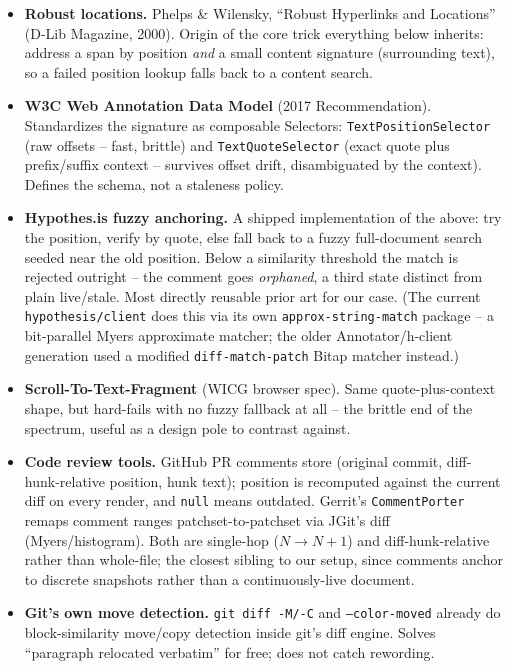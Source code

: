 \documentclass{amsart}
\theoremstyle{remark}
\begin{document}
    \begin{itemize}
        \item \textbf{Robust locations.} Phelps \& Wilensky, ``Robust Hyperlinks and Locations'' (D-Lib Magazine, 2000). Origin of the core trick everything below inherits: address a span by position \emph{and} a small content signature (surrounding text), so a failed position lookup falls back to a content search.
        \item \textbf{W3C Web Annotation Data Model} (2017 Recommendation). Standardizes the signature as composable Selectors: \texttt{TextPositionSelector} (raw offsets -- fast, brittle) and \texttt{TextQuoteSelector} (exact quote plus prefix/suffix context -- survives offset drift, disambiguated by the context). Defines the schema, not a staleness policy.
        \item \textbf{Hypothes.is fuzzy anchoring.} A shipped implementation of the above: try the position, verify by quote, else fall back to a fuzzy full-document search seeded near the old position. Below a similarity threshold the match is rejected outright -- the comment goes \emph{orphaned}, a third state distinct from plain live/stale. Most directly reusable prior art for our case. (The current \texttt{hypothesis/client} does this via its own \texttt{approx-string-match} package -- a bit-parallel Myers approximate matcher; the older Annotator/h-client generation used a modified \texttt{diff-match-patch} Bitap matcher instead.)
        \item \textbf{Scroll-To-Text-Fragment} (WICG browser spec). Same quote-plus-context shape, but hard-fails with no fuzzy fallback at all -- the brittle end of the spectrum, useful as a design pole to contrast against.
        \item \textbf{Code review tools.} GitHub PR comments store (original commit, diff-hunk-relative position, hunk text); position is recomputed against the current diff on every render, and \texttt{null} means outdated. Gerrit's \texttt{CommentPorter} remaps comment ranges patchset-to-patchset via JGit's diff (Myers/histogram). Both are single-hop ($N \to N+1$) and diff-hunk-relative rather than whole-file; the closest sibling to our setup, since comments anchor to discrete snapshots rather than a continuously-live document.
        \item \textbf{Git's own move detection.} \texttt{git diff -M/-C} and \texttt{--color-moved} already do block-similarity move/copy detection inside git's diff engine. Solves ``paragraph relocated verbatim'' for free; does not catch rewording.

\end{itemize}
\end{document}
